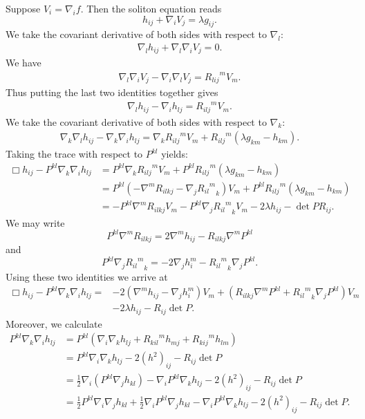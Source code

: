 \documentclass{amsart}
\theoremstyle{definition}
\theoremstyle{remark}
\numberwithin{equation}{section}
\begin{document}
Suppose $V_i=\nabla_if.$ Then the soliton equation reads
\begin{equation}
h_{ij}+\nabla_iV_j=\lambda g_{ij}.
\end{equation}
We take the covariant derivative of both sides with respect to $\nabla_l:$
\begin{align*}
\nabla_lh_{ij}+\nabla_l\nabla_iV_j=0.
\end{align*}
We have
\begin{align*}
\nabla_l\nabla_iV_j-\nabla_i\nabla_lV_j={R_{lij}}^mV_m.
\end{align*}
Thus putting the last two identities together gives
\begin{align*}
\nabla_lh_{ij}-\nabla_ih_{lj}={R_{ilj}}^mV_m.
\end{align*}
We take the covariant derivative of both sides with respect to $\nabla_k:$
\begin{align*}
\nabla_k\nabla_lh_{ij}-\nabla_k\nabla_ih_{lj}=\nabla_k{R_{ilj}}^mV_m+{R_{ilj}}^m(\lambda g_{km}-h_{km}).
\end{align*}
Taking the trace with respect to $P^{kl}$ yields:
\begin{align*}
\Box h_{ij}-P^{kl}\nabla_k\nabla_ih_{lj}&=P^{kl}\nabla_k{R_{ilj}}^mV_m+P^{kl}{R_{ilj}}^m(\lambda g_{km}-h_{km})\\
&=P^{kl}(-\nabla^mR_{ilkj}-\nabla_j{{R_{il}}^m}_k)V_m+P^{kl}{R_{ilj}}^m(\lambda g_{km}-h_{km})\\
&=-P^{kl}\nabla^mR_{ilkj}V_m-P^{kl}\nabla_j{{R_{il}}^m}_kV_m-2\lambda h_{ij}-\det P R_{ij}.
\end{align*}
We may write
\[P^{kl}\nabla^mR_{ilkj}=2\nabla^mh_{ij}-R_{ilkj}\nabla^mP^{kl}\]
and
\[P^{kl}\nabla_j{{R_{il}}^m}_k=-2\nabla_jh_i^m-{{R_{il}}^m}_k\nabla_jP^{kl}.\]
Using these two identities we arrive at
\begin{align*}
\Box h_{ij}-P^{kl}\nabla_k\nabla_ih_{lj}=&-2(\nabla^mh_{ij}-\nabla_jh_i^m)V_m+(R_{ilkj}\nabla^mP^{kl}+{{R_{il}}^m}_k\nabla_jP^{kl})V_m\\
&-2\lambda h_{ij}-R_{ij}\det P .
\end{align*}
Moreover, we calculate
\begin{align*}
P^{kl}\nabla_k\nabla_ih_{lj}&=P^{kl}(\nabla_i\nabla_k h_{lj}+{R_{kil}}^mh_{mj}+{R_{kij}}^mh_{lm})\\
&=P^{kl}\nabla_i\nabla_k h_{lj}-2(h^2)_{ij}-R_{ij}\det P\\
&=\frac{1}{2}\nabla_i(P^{kl}\nabla_j h_{kl})-\nabla_iP^{kl}\nabla_k h_{lj}-2(h^2)_{ij}-R_{ij}\det P\\
&=\frac{1}{2}P^{kl}\nabla_i\nabla_j h_{kl}+\frac{1}{2}\nabla_iP^{kl}\nabla_j h_{kl}-\nabla_iP^{kl}\nabla_k h_{lj}-2(h^2)_{ij}-R_{ij}\det P.
\end{align*}
\end{document}
